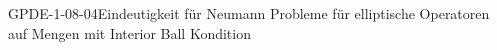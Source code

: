 
\begin{KORO}{GPDE-1-08-04}{Eindeutigkeit für Neumann Probleme für elliptische Operatoren auf Mengen mit Interior Ball Kondition}
\end{KORO}
